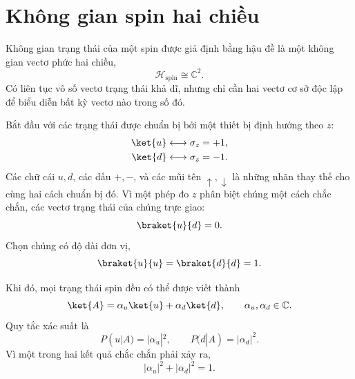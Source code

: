 \begin{classroomqa}
\end{classroomqa}

\section{Không gian spin hai chiều}

Không gian trạng thái của một spin được giả định bằng hậu đề là một không gian vectơ phức hai chiều,
\begin{equation}
\mathcal H_{\mathrm{spin}}\cong\mathbb C^2.
\end{equation}
Có liên tục vô số vectơ trạng thái khả dĩ, nhưng chỉ cần hai vectơ cơ sở độc lập để biểu diễn bất kỳ vectơ nào trong số đó.

Bắt đầu với các trạng thái được chuẩn bị bởi một thiết bị định hướng theo \(z\):
\begin{align}
\ket{u}&\longleftrightarrow \sigma_z=+1,\\
\ket{d}&\longleftrightarrow \sigma_z=-1.
\end{align}
Các chữ cái \(u,d\), các dấu \(+,-\), và các mũi tên \(\uparrow,\downarrow\) là những nhãn thay thế cho cùng hai cách chuẩn bị đó. Vì một phép đo \(z\) phân biệt chúng một cách chắc chắn, các vectơ trạng thái của chúng trực giao:
\begin{equation}
\braket{u}{d}=0.
\end{equation}
Chọn chúng có độ dài đơn vị,
\[
\braket{u}{u}=\braket{d}{d}=1.
\]

Khi đó, mọi trạng thái spin đều có thể được viết thành
\begin{equation}
\ket{A}=\alpha_u\ket{u}+\alpha_d\ket{d},
\qquad \alpha_u,\alpha_d\in\mathbb C.
\label{eq:general-spin-state}
\end{equation}
Quy tắc xác suất là
\begin{equation}
P(u|A)=|\alpha_u|^2,\qquad
P(d|A)=|\alpha_d|^2.
\label{eq:born-z}
\end{equation}
Vì một trong hai kết quả chắc chắn phải xảy ra,
\begin{equation}
|\alpha_u|^2+|\alpha_d|^2=1.
\label{eq:normalization}
\end{equation}

